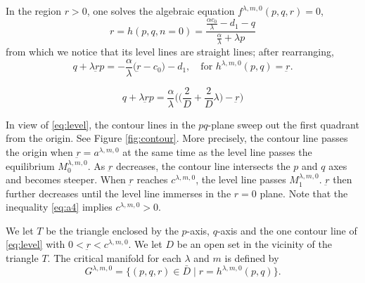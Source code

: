 \documentclass[a4paper,11pt]{article}
\begin{document}
In the region $r>0$, one solves the algebraic equation $f^{\lambda,m,0}(p,q,r)=0$,
\begin{equation}\label{eq:hn0}
 r=h(p,q,n=0) = \frac{ \frac{\alpha c_0}{\lambda} - d_1 -q }{ \frac{\alpha}{\lambda} + \lambda p}
\end{equation} 
from which we notice that its level lines are straight lines; after rearranging, 
\begin{equation}
 q + \lambda \underbar{r}p =  -\frac{\alpha}{\lambda} \big( \underbar{r} - c_0\big)-d_1, \quad \text{for  $h^{\lambda,m,0}(p,q)=\underbar{r}$.} \label{eq:level}
\end{equation}

\begin{equation}
 q + \lambda \underbar{r}p =  \frac{\alpha}{\lambda} \Big( \big(\frac{2}{D} + \frac{2}{D}\lambda\big) - \underbar{r} \Big)
\end{equation}

In view of \eqref{eq:level}, the contour lines in the $pq$-plane sweep out the first quadrant from the origin. See Figure \ref{fig:contour}. More precisely, the contour line passes the origin when $\underbar{r}=a^{ \lambda,m,0}$ at the same time as the level line passes the equilibrium $M_0^{ \lambda,m,0}$. As $\underbar{r}$ decreases, the contour line intersects the $p$ and $q$ axes and becomes steeper. When $\underbar{r}$ reaches $c^{ \lambda,m,0}$, the level line passes $M_1^{ \lambda,m,0}$. $\underbar{r}$ then further decreases until the level line immerses in the $r=0$ plane. Note that the inequality \eqref{eq:a4} implies $c^{ \lambda,m,0}>0$. 


We let $T$ be the triangle enclosed by the $p$-axis, $q$-axis and the one contour line of \eqref{eq:level} with $0<\underbar{r} < c^{\lambda,m,0}$. We let $D$ be an open set in the vicinity of the triangle $T$. The critical manifold for each $\lambda$ and $m$ is defined by 
\begin{equation}
 G^{\lambda,m,0} = \{(p,q,r) \in \bar{D} \;|\; r=h^{\lambda,m,0}(p,q)\}.
\end{equation}
\end{document}
